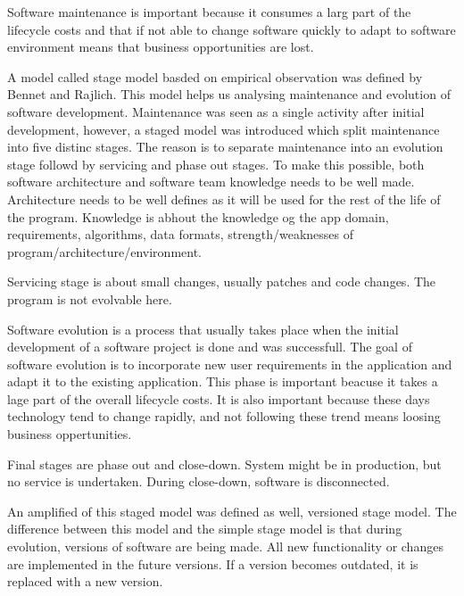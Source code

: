 Software maintenance is important because it consumes a larg part of the lifecycle costs and that if not able to change software quickly to adapt to software environment means that business opportunities are lost.


A model called stage model basded on empirical observation was defined by Bennet and Rajlich. This model helps us analysing maintenance and evolution of software development. Maintenance was seen as a single activity after initial development, however, a staged model was introduced which split maintenance into five distinc stages. The reason is to separate maintenance into an evolution stage followd by servicing and phase out stages. To make this possible, both software architecture and software team knowledge needs to be well made. Architecture needs to be well defines as it will be used for the rest of the life of the program. Knowledge is abhout the knowledge og the app domain, requirements, algorithms, data formats, strength/weaknesses of program/architecture/environment.

Servicing stage is about small changes, usually patches and code changes. The program is not evolvable here. 

Software evolution is a process that usually takes place when the initial development of a software project is done and was successfull. The goal of software evolution is to incorporate new user requirements in the application and adapt it to the existing application. This phase is important beacuse it takes a lage part of the overall lifecycle costs. It is also important because these days technology tend to change rapidly, and not following these trend means loosing business oppertunities.

Final stages are phase out and close-down. System might be in production, but no service is undertaken. During close-down, software is disconnected. 

An amplified of this staged model was defined as well, versioned stage model. The difference between this model and the simple stage model is that during evolution, versions of software are being made. All new functionality or changes are implemented in the future versions. If a version becomes outdated, it is replaced with a new version.	






